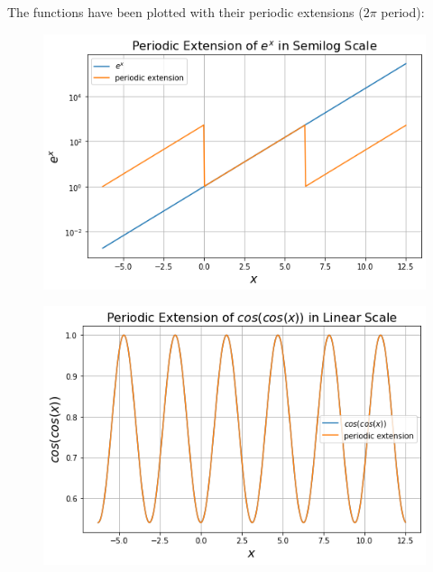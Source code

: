 \documentclass[12pt, a4paper]{article}
\begin{document}
The functions have been plotted with their periodic extensions ($2\pi$ period):
\begin{figure}[H]
    \centering
    \includegraphics[scale=0.6]{1a.png}
\end{figure}
\begin{figure}[H]
    \centering
    \includegraphics[scale=0.6]{1b.png}
\end{figure}
\pagebreak
\end{document}
